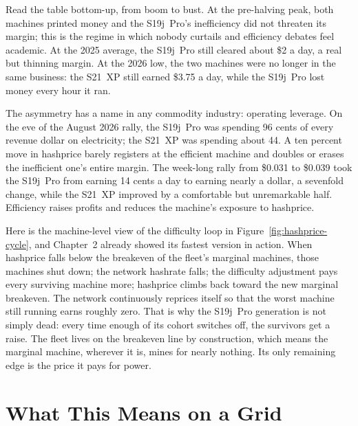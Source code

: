 Read the table bottom-up, from boom to bust. At the pre-halving peak, both machines printed money and the S19j~Pro's inefficiency did not threaten its margin; this is the regime in which nobody curtails and efficiency debates feel academic. At the 2025 average, the S19j~Pro still cleared about \$2 a day, a real but thinning margin. At the 2026 low, the two machines were no longer in the same business: the S21~XP still earned \$3.75 a day, while the S19j~Pro lost money every hour it ran.

The asymmetry has a name in any commodity industry: operating leverage. On the eve of the August 2026 rally, the S19j~Pro was spending 96 cents of every revenue dollar on electricity; the S21~XP was spending about 44. %
A ten percent move in hashprice barely registers at the efficient machine and doubles or erases the inefficient one's entire margin. The week-long rally from \$0.031 to \$0.039 took the S19j~Pro from earning 14 cents a day to earning nearly a dollar, a sevenfold change, while the S21~XP improved by a comfortable but unremarkable half. %
Efficiency raises profits and reduces the machine's exposure to hashprice.

Here is the machine-level view of the difficulty loop in Figure~\ref{fig:hashprice-cycle}, and Chapter~2 already showed its fastest version in action. When hashprice falls below the breakeven of the fleet's marginal machines, those machines shut down; the network hashrate falls; the difficulty adjustment pays every surviving machine more; hashprice climbs back toward the new marginal breakeven. The network continuously reprices itself so that the worst machine still running earns roughly zero. %
That is why the S19j~Pro generation is not simply dead: every time enough of its cohort switches off, the survivors get a raise. The fleet lives on the breakeven line by construction, which means the marginal machine, wherever it is, mines for nearly nothing. Its only remaining edge is the price it pays for power.

\section{What This Means on a Grid}

